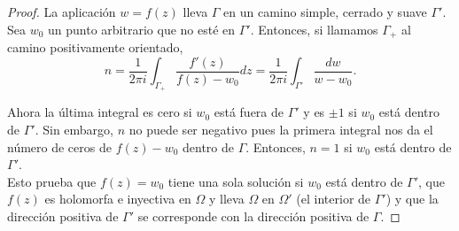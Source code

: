 \begin{proof}
    La aplicación $w = f(z)$ lleva $\Gamma$ en un camino simple, cerrado y suave $\Gamma'$. Sea $w_0$ un punto arbitrario que no esté en $\Gamma'$. Entonces, si llamamos $\Gamma_+$ al camino positivamente orientado,
    \begin{equation*}
        n = \dfrac{1}{2 \pi i} \int_{\Gamma_+} \dfrac{f'(z)}{f(z) - w_0} dz =  \dfrac{1}{2 \pi i} \int_{\Gamma'} \dfrac{dw}{w - w_0}.
    \end{equation*}

    Ahora la última integral es cero si $w_0$ está fuera de $\Gamma'$ y es $\pm 1$ si $w_0$ está dentro de $\Gamma'$. Sin embargo, $n$ no puede ser negativo pues la primera integral nos da el número de ceros de $f(z) - w_0$ dentro de $\Gamma$. Entonces, $n=1$ si $w_0$ está dentro de $\Gamma'$. \\

    Esto prueba que $f(z) = w_0$ tiene una sola solución si $w_0$ está dentro de $\Gamma'$, que $f(z)$ es holomorfa e inyectiva en $\Omega$ y lleva $\Omega$ en $\Omega'$ (el interior de $\Gamma'$) y que la dirección positiva de $\Gamma'$ se corresponde con la dirección positiva de $\Gamma$.
\end{proof}

